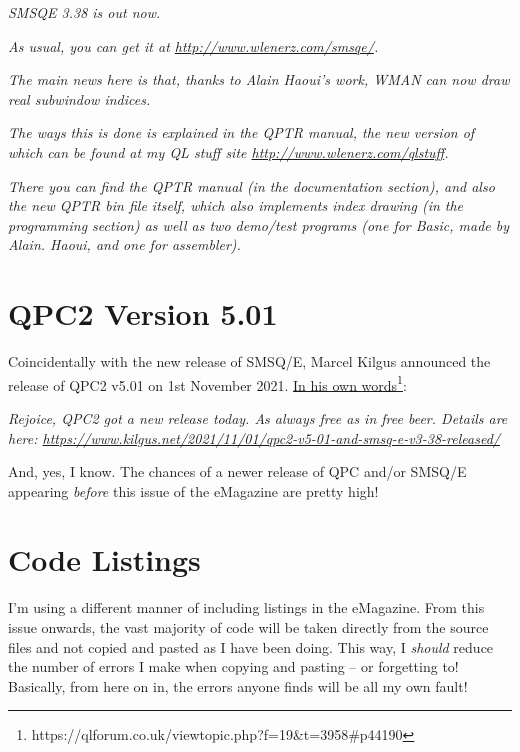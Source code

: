 \emph{SMSQE 3.38 is out now.}

\emph{As usual, you can get it at \href{http://www.wlenerz.com/smsqe/}{http://www.wlenerz.com/smsqe/}.}

\emph{The main news here is that, thanks to Alain Haoui's work, WMAN
can now draw real subwindow indices.}

\emph{The ways this is done is explained in the QPTR manual, the new
version of which can be found at my QL stuff site \href{http://www.wlenerz.com/qlstuff}{http://www.wlenerz.com/qlstuff}.}

\emph{There you can find the QPTR manual (in the documentation section),
and also the new QPTR bin file itself, which also implements index
drawing (in the programming section) as well as two demo/test programs
(one for Basic, made by Alain. Haoui, and one for assembler).}

\section{QPC2 Version 5.01}

Coincidentally with the new release of SMSQ/E, Marcel Kilgus announced
the release of QPC2 v5.01 on 1st November 2021. \href{https://qlforum.co.uk/viewtopic.php?f=19&t=3958\#p44190}{In his own words}\footnote{https://qlforum.co.uk/viewtopic.php?f=19\&t=3958\#p44190}:

\emph{Rejoice, QPC2 got a new release today. As always free as in
\textquotedbl free beer\textquotedbl . Details are here: \href{https://www.kilgus.net/2021/11/01/qpc2-v5-01-and-smsq-e-v3-38-released/}{https://www.kilgus.net/2021/11/01/qpc2-v5-01-and-smsq-e-v3-38-released/}}

And, yes, I know. The chances of a newer release of QPC and/or SMSQ/E
appearing \emph{before} this issue of the eMagazine are pretty high!

\section{Code Listings}

I'm using a different manner of including listings in the eMagazine.
From this issue onwards, the vast majority of code will be taken directly
from the source files and not copied and pasted as I have been doing.
This way, I \emph{should} reduce the number of errors I make when
copying and pasting -- or forgetting to! Basically, from here on
in, the errors anyone finds will be all my own fault!

